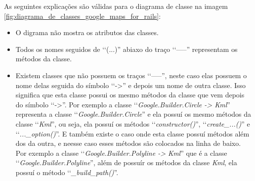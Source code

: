 As seguintes explicações são válidas para o diagrama de classe na imagem
\ref{fig:diagrama_de_classes_google_maps_for_rails}:

\begin{itemize}

 \item O digrama não mostra os atributos das classes. 
 
 \item Todos os nomes seguidos de ‘‘(...)'' abiaxo do traço ‘‘-----'' representam os métodos da classe.
 
 \item Existem classes que não possuem os traços ‘‘-----'', neste caso elas possuem o nome delas
 seguida do símbolo ‘‘->'' e depois um nome de outra classe. Isso significa que esta classe
 possui os mesmo métodos da classe que vem depois do símbolo ‘‘->''. Por exemplo a 
 classe ‘‘\emph{Google.Builder.Circle -> Kml}'' representa a classe ‘‘\emph{Google.Builder.Circle}'' 
 e ela possuí os mesmo métodos da classe ‘‘\emph{Kml}'', ou seja, ela possuí os métodos
 ‘‘\emph{constructor()}'', ‘‘\emph{create\_...()}'' e ‘‘\emph{...\_option()}''. E também existe o caso 
 onde esta classe possuí métodos além dos da outra, e neesse caso esses métodos são colocados na linha 
 de baixo. Por exemplo a classe ‘‘\emph{Google.Builder.Polyline -> Kml}'' que é a classe 
 ‘‘\emph{Google.Builder.Polyline}'', além de possuír os métodos da classe \emph{Kml}, ela 
 possuí o método ‘‘\emph{\_build\_path()}''.
 
\end{itemize}

